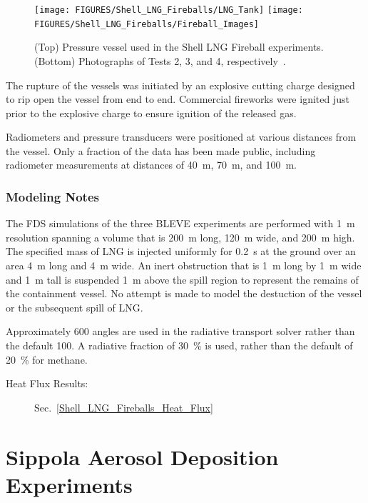 \begin{figure}[!ht]
\texttt{[image: FIGURES/Shell\_LNG\_Fireballs/LNG\_Tank]}
\texttt{[image: FIGURES/Shell\_LNG\_Fireballs/Fireball\_Images]}
\caption[Photographs of the Shell LNG Fireball experiments]{(Top) Pressure vessel used in the Shell LNG Fireball experiments. (Bottom) Photographs of Tests 2, 3, and 4, respectively~\cite{Betteridge:2015}.}
\label{Shell_LNG_Fireball_Photos}
\end{figure}

The rupture of the vessels was initiated by an explosive cutting charge designed to rip open the vessel from end to end. Commercial fireworks were ignited just prior to the explosive charge to ensure ignition of the released gas.

Radiometers and pressure transducers were positioned at various distances from the vessel. Only a fraction of the data has been made public, including radiometer measurements at distances of 40~m, 70~m, and 100~m.

\subsubsection{Modeling Notes}

The FDS simulations of the three BLEVE experiments are performed with 1~m resolution spanning a volume that is 200~m long, 120~m wide, and 200~m high. The specified mass of LNG is injected uniformly for 0.2~s at the ground over an area 4~m long and 4~m wide. An inert obstruction that is 1~m long by 1~m wide and 1~m tall is suspended 1~m above the spill region to represent the remains of the containment vessel. No attempt is made to model the destuction of the vessel or the subsequent spill of LNG.

Approximately 600 angles are used in the radiative transport solver rather than the default 100. A radiative fraction of 30~\% is used, rather than the default of 20~\% for methane.

\begin{description}
\item[Heat Flux Results:] Sec.~\ref{Shell_LNG_Fireballs_Heat_Flux}
\end{description}

\FloatBarrier



\section{Sippola Aerosol Deposition Experiments}
\label{Sippola_Aerosol_Deposition_Description}


